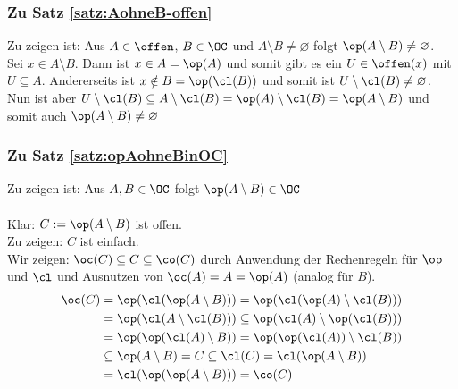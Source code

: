 \subsubsection{Zu Satz \ref{satz:AohneB-offen}}\label{anh:AohneB-offen}
    Zu zeigen ist: Aus $A \in \offen$, $B \in \OC$ und $A \setminus B \neq \varnothing$ folgt $\op(A \setminus B) \neq \varnothing$.\\
    Sei $x \in A \setminus B$. Dann ist $x \in A = \op(A)$ und somit gibt es ein ${U \in \offen(x)}$ mit ${U \subseteq A}$. 
    Andererseits ist $x \notin B = \op(\cl(B))$ und somit ist $U \setminus \cl(B) \neq \varnothing$. 
    Nun ist aber $U \setminus \cl(B) \subseteq A \setminus \cl(B) = \op(A) \setminus \cl(B) = \op(A \setminus B)$ und somit auch $\op(A \setminus B) \neq \varnothing$

    
\subsubsection{Zu Satz \ref{satz:opAohneBinOC}}\label{anh:opAohneBinOC}
    Zu zeigen ist: Aus $A,B \in \OC$ folgt $\op(A \setminus B) \in \OC$\\ \ \\
    Klar: $C := \op(A \setminus B)$ ist offen.\\
    Zu zeigen: $C$ ist einfach.\\
    Wir zeigen: $\oc(C) \subseteq C \subseteq \co(C)$ durch Anwendung der Rechenregeln für $\op$ und $\cl$ und Ausnutzen von $\oc(A) = A = \op(A)$ (analog für $B$).
    \begin{align*}
        \oc(C) 
        &= \op(\cl(\op(A \setminus B))) 
        = \op(\cl(\op(A) \setminus \cl(B))) 
        \\
        &= \op(\cl(A \setminus \cl(B)))
        \subseteq \op(\cl(A) \setminus \op(\cl(B)))
        \\
        &= \op(\op(\cl(A) \setminus B))
        = \op(\op(\cl(A)) \setminus \cl(B))
        \\
        &\subseteq \op(A \setminus B)
        = C
        \subseteq \cl(C)
        = \cl(\op(A \setminus B))
        \\
        &= \cl(\op(\op(A \setminus B)))
        = \co(C)
    \end{align*}

    
    







